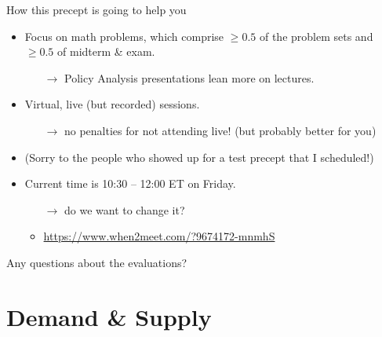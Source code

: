 \documentclass[10pt]{beamer}
\begin{document}
\begin{frame}{How this precept is going to help you}
    \begin{itemize}
        \item Focus on math problems, which comprise \(\geq 0.5\) of the problem sets and \(\geq 0.5\) of midterm \& exam.
        \begin{itemize}
            \item[\(\rightarrow\)] Policy Analysis presentations lean more on lectures.
        \end{itemize}
        \item Virtual, live (but recorded) sessions.
        \begin{itemize}
            \item[\(\rightarrow\)] no penalties for not attending live! (but probably better for you)
        \end{itemize}
        \item (Sorry to the people who showed up for a test precept that I scheduled!)
        \item Current time is 10:30 -- 12:00 ET on Friday.
        \begin{itemize}
            \item[\(\rightarrow\)] do we want to change it?
            \item \url{https://www.when2meet.com/?9674172-mnmhS}
        \end{itemize}
    \end{itemize}
    \pause
    \vspace{\baselineskip}
    Any questions about the evaluations?
\end{frame}

\section{Demand \& Supply}
\end{document}
